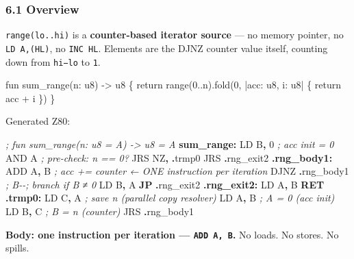 \documentclass[
  11pt,
  a4paper,
]{report}
\newenvironment{Shaded}{\begin{snugshade}\small}{\end{snugshade}}
\newcommand{\BuiltInTok}[1]{#1}
\newcommand{\CommentTok}[1]{\textcolor[rgb]{0.56,0.35,0.01}{\textit{#1}}}
\newcommand{\ControlFlowTok}[1]{\textcolor[rgb]{0.13,0.29,0.53}{\textbf{#1}}}
\newcommand{\DecValTok}[1]{\textcolor[rgb]{0.00,0.00,0.81}{#1}}
\newcommand{\FunctionTok}[1]{\textcolor[rgb]{0.13,0.29,0.53}{\textbf{#1}}}
\newcommand{\NormalTok}[1]{#1}
\newcommand{\OperatorTok}[1]{\textcolor[rgb]{0.81,0.36,0.00}{\textbf{#1}}}
\begin{document}
\subsubsection{6.1 Overview}\label{overview}

\texttt{range(lo..hi)} is a \textbf{counter-based iterator source} ---
no memory pointer, no \texttt{LD\ A,(HL)}, no \texttt{INC\ HL}. Elements
are the DJNZ counter value itself, counting down from \texttt{hi−lo} to
\texttt{1}.

\begin{Shaded}
\begin{Highlighting}[]
\NormalTok{fun sum\_range(n: u8) {-}\textgreater{} u8 \{}
\NormalTok{    return range(0..n).fold(0, |acc: u8, i: u8| \{ return acc + i \})}
\NormalTok{\}}
\end{Highlighting}
\end{Shaded}

Generated Z80:

\begin{Shaded}
\begin{Highlighting}[]
\CommentTok{; fun sum\_range(n: u8 = A) {-}\textgreater{} u8 = A}
\FunctionTok{sum\_range:}
\NormalTok{    LD B}\OperatorTok{,} \DecValTok{0}              \CommentTok{; acc init = 0}
    \BuiltInTok{AND}\NormalTok{ A                }\CommentTok{; pre{-}check: n == 0?}
\NormalTok{    JRS NZ}\OperatorTok{,} \OperatorTok{.}\NormalTok{trmp0}
\NormalTok{    JRS }\OperatorTok{.}\NormalTok{rng\_exit2}
\FunctionTok{.rng\_body1:}
    \BuiltInTok{ADD}\NormalTok{ A}\OperatorTok{,}\NormalTok{ B             }\CommentTok{; acc += counter  ← ONE instruction per iteration}
\NormalTok{    DJNZ }\OperatorTok{.}\NormalTok{rng\_body1      }\CommentTok{; B{-}{-}; branch if B ≠ 0}
\NormalTok{    LD B}\OperatorTok{,}\NormalTok{ A}
    \ControlFlowTok{JP} \OperatorTok{.}\NormalTok{rng\_exit2}
\FunctionTok{.rng\_exit2:}
\NormalTok{    LD A}\OperatorTok{,}\NormalTok{ B}
    \ControlFlowTok{RET}
\FunctionTok{.trmp0:}
\NormalTok{    LD C}\OperatorTok{,}\NormalTok{ A              }\CommentTok{; save n (parallel copy resolver)}
\NormalTok{    LD A}\OperatorTok{,}\NormalTok{ B              }\CommentTok{; A = 0 (acc init)}
\NormalTok{    LD B}\OperatorTok{,}\NormalTok{ C              }\CommentTok{; B = n (counter)}
\NormalTok{    JRS }\OperatorTok{.}\NormalTok{rng\_body1}
\end{Highlighting}
\end{Shaded}

\textbf{Body: one instruction per iteration --- \texttt{ADD\ A,\ B}.} No
loads. No stores. No spills.
\end{document}
